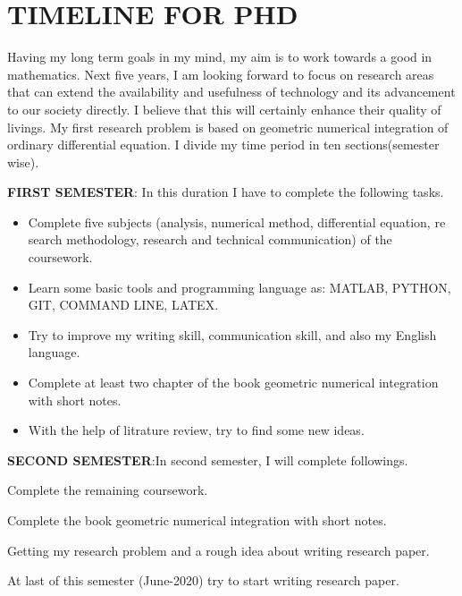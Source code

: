 \documentclass[PhD]{iitmdiss} %
\begin{document}
\appendix
\chapter{TIMELINE FOR PHD}

Having my long term goals in my mind, my aim is to work towards a good in
mathematics. Next five years, I am looking forward to focus on research areas that
can extend the availability and usefulness of technology and its advancement to our
society directly. I believe that this will certainly enhance their quality of livings.
My first research problem is based on geometric numerical integration of ordinary
differential equation.
I divide my time period in ten sections(semester wise).

    {\textbf{FIRST SEMESTER}:{ In this duration I have to complete the following tasks.}\\
    \begin{itemize}
 
    
    \item{Complete five subjects (analysis, numerical method, differential equation, re
search methodology, research and technical communication) of the coursework.}\\
\item{Learn some basic tools and programming language as: MATLAB, PYTHON,
GIT, COMMAND LINE, LATEX.}\\
\item{Try to improve my writing skill, communication skill, and also my English
language.}\\
\item{Complete at least two chapter of the book geometric numerical integration with
short notes.}\\
\item{With the help of litrature review, try to find some new ideas.}\\
\end{itemize}
{\textbf{SECOND SEMESTER}:{In second semester, I will complete followings.}\\
\begin{itemize}
    

    \item{Complete the remaining coursework.\\
 \item{ Complete the book geometric numerical integration with short notes.}\\
 \item{Getting my research problem and a rough idea about writing research paper.}\\
 \item{At last of this semester (June-2020) try to start writing research paper.}\\
 
}
\end{itemize}}}
\end{document}
